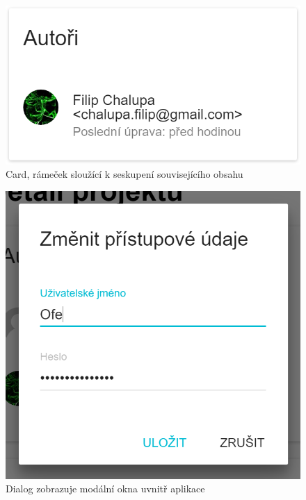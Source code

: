 \begin{figure}[ht]
	\centering
	\includegraphics[scale=0.5]{sections/ui/images/Card.png}
	\caption[Card]{Card, rámeček sloužící k seskupení souvisejícího obsahu}
	\label{fig:card}
\end{figure}

\begin{figure}[ht]
	\centering
	\includegraphics[scale=0.5]{sections/ui/images/Dialog.png}
	\caption[Dialog]{Dialog zobrazuje modální okna uvnitř aplikace}
	\label{fig:dialog}
\end{figure}

